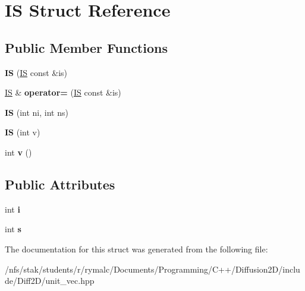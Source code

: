 \hypertarget{structIS}{\section{I\+S Struct Reference}
\label{structIS}
}
\subsection*{Public Member Functions}
\begin{DoxyCompactItemize}
\item 
\hypertarget{structIS_a5f2e1beab9d7c11118551880b0c47410}{{\bfseries I\+S} (\hyperlink{structIS}{I\+S} const \&is)}\label{structIS_a5f2e1beab9d7c11118551880b0c47410}

\item 
\hypertarget{structIS_aec66c50fd699031a1f617117c67eda11}{\hyperlink{structIS}{I\+S} \& {\bfseries operator=} (\hyperlink{structIS}{I\+S} const \&is)}\label{structIS_aec66c50fd699031a1f617117c67eda11}

\item 
\hypertarget{structIS_a2cb6d148c70406c11b9508be2cfddd7e}{{\bfseries I\+S} (int ni, int ns)}\label{structIS_a2cb6d148c70406c11b9508be2cfddd7e}

\item 
\hypertarget{structIS_a53883df04399eab305d240898e889271}{{\bfseries I\+S} (int v)}\label{structIS_a53883df04399eab305d240898e889271}

\item 
\hypertarget{structIS_ad474289c5f0f5f5b231cd2067547cc0f}{int {\bfseries v} ()}\label{structIS_ad474289c5f0f5f5b231cd2067547cc0f}

\end{DoxyCompactItemize}
\subsection*{Public Attributes}
\begin{DoxyCompactItemize}
\item 
\hypertarget{structIS_ac0a890989ec0d04b8db157583b154c17}{int {\bfseries i}}\label{structIS_ac0a890989ec0d04b8db157583b154c17}

\item 
\hypertarget{structIS_a3a4dc37a5dc69fa81e33c5e7115dca71}{int {\bfseries s}}\label{structIS_a3a4dc37a5dc69fa81e33c5e7115dca71}

\end{DoxyCompactItemize}


The documentation for this struct was generated from the following file\+:\begin{DoxyCompactItemize}
\item 
/nfs/stak/students/r/rymalc/\+Documents/\+Programming/\+C++/\+Diffusion2\+D/include/\+Diff2\+D/unit\+\_\+vec.\+hpp\end{DoxyCompactItemize}
